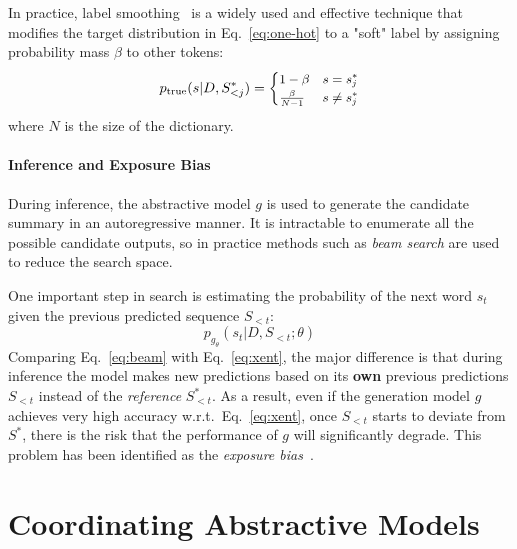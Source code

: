 \documentclass[11pt]{article}
\begin{document}
In practice, label smoothing~\citep{7780677} is a widely used and effective technique that modifies the target distribution in Eq.~\ref{eq:one-hot} to a "soft" label by assigning probability mass $\beta$ to other tokens:
\begin{equation}
    \small
    p_{\mathrm{true}} (s|D, S_{<j}^*) = 
    \begin{cases}
    1 - \beta & s = s_j^* \\
    \frac{\beta}{N-1} & s \neq s_j^* \\
    \end{cases}
\label{eq:label_smoothing}
\end{equation}
where $N$ is the size of the dictionary.

\paragraph{Inference and Exposure Bias}

During inference, the abstractive model $g$ is used to generate the candidate summary in an autoregressive manner.
It is intractable to enumerate all the possible candidate outputs, so in practice methods such as \textit{beam search} are used to reduce the search space.

One important step in search is estimating the probability of the next word $s_t$ given the previous predicted sequence $S_{<t}$:
\begin{equation}
\label{eq:beam}
    p_{g_\theta}(s_{t}|D, S_{<t}; \theta)
\end{equation}
Comparing Eq.~\ref{eq:beam} with Eq.~\ref{eq:xent}, the major difference is that during inference the model makes new predictions based on its \textbf{own} previous predictions $S_{<t}$ instead of the \textit{reference} $S^*_{<t}$.
As a result, even if the generation model $g$ achieves very high accuracy w.r.t.~Eq.~\ref{eq:xent}, once $S_{<t}$ starts to deviate from $S^*$, there is the risk that the performance of $g$ will significantly degrade.
This problem has been identified as the \textit{exposure bias}~\citep{10.5555/2969239.2969370}. 


\section{Coordinating Abstractive Models}
\end{document}
